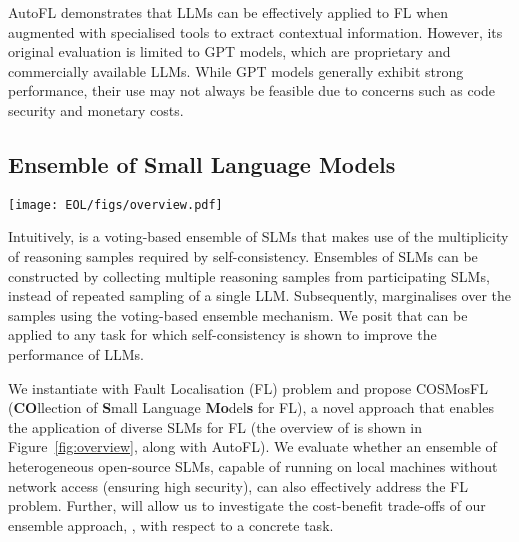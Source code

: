 AutoFL demonstrates that LLMs can be effectively applied to FL when augmented with specialised tools to extract contextual information. However, its original evaluation is limited to GPT models, which are proprietary and commercially available LLMs. While GPT models generally exhibit strong performance, their use may not always be feasible due to concerns such as code security and monetary costs.

\subsection{Ensemble of Small Language Models}

\begin{figure*}[t]
\centerline{\texttt{[image: EOL/figs/overview.pdf]}}
\caption{Overview of our approach against AutoFL~\cite{kangQuantitativeQualitativeEvaluation2024a} with differences colored in red.}
\label{fig:overview}
\end{figure*}

Intuitively, \name is a voting-based ensemble of SLMs that makes use of the multiplicity of reasoning samples required by self-consistency. Ensembles of SLMs can be constructed by collecting multiple reasoning samples from participating SLMs, instead of repeated sampling of a single LLM. Subsequently, \name marginalises over the samples using the voting-based ensemble mechanism. We posit that \name can be applied to any task for which self-consistency is shown to improve the performance of LLMs.

We instantiate \name with Fault Localisation (FL) problem and propose COSMosFL (\textbf{CO}llection of \textbf{S}mall Language \textbf{Mo}del\textbf{s} for FL), a novel approach that enables the application of diverse SLMs for FL (the overview of \cosmosfl is shown in Figure~\ref{fig:overview}, along with AutoFL). We evaluate whether an ensemble of heterogeneous open-source SLMs, capable of running on local machines without network access (ensuring high security), can also effectively address the FL problem. Further, \cosmosfl will allow us to investigate the cost-benefit trade-offs of our ensemble approach, \name, with respect to a concrete task.



